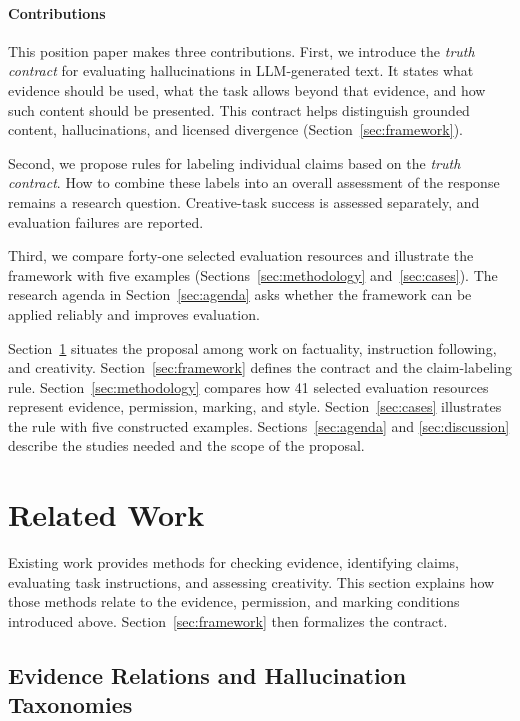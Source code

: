 \documentclass{clv2025}
\begin{document}
\paragraph{Contributions}
This position paper makes three contributions. First, we introduce the
\emph{truth contract} for evaluating hallucinations in LLM-generated text. It states what evidence should be used, what the task
allows beyond that evidence, and how such content should be presented. This
contract helps distinguish grounded content, hallucinations, and licensed
divergence (Section~\ref{sec:framework}).

Second, we propose rules for labeling individual claims based on the \emph{truth contract}.
How to combine these labels into an overall assessment of the response remains a research question. 
Creative-task success is assessed separately, and evaluation failures are reported.

Third, we compare forty-one selected evaluation resources and illustrate the
framework with five examples
(Sections~\ref{sec:methodology} and~\ref{sec:cases}). %
The research agenda in Section~\ref{sec:agenda} asks whether the framework can be applied reliably and improves evaluation.

Section~\ref{sec:related} situates the proposal among work on factuality,
instruction following, and creativity. Section~\ref{sec:framework} defines
the contract and the claim-labeling rule. Section~\ref{sec:methodology}
compares how 41 selected evaluation resources represent evidence,
permission, marking, and style. Section~\ref{sec:cases} illustrates the rule
with five constructed examples. Sections~\ref{sec:agenda} and
\ref{sec:discussion} describe the studies needed and the scope of the proposal.

\section{Related Work}\label{sec:related}

Existing work provides methods for checking evidence, identifying claims,
evaluating task instructions, and assessing creativity. This section explains
how those methods relate to the evidence, permission, and marking conditions
introduced above. Section~\ref{sec:framework} then formalizes the contract.

\subsection{Evidence Relations and Hallucination Taxonomies}
\end{document}
